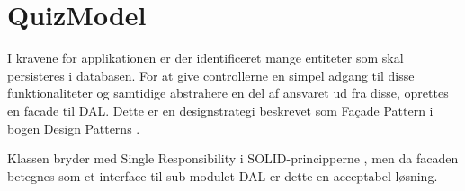 \section{QuizModel}

I kravene for applikationen er der identificeret mange entiteter som skal persisteres i databasen. For at give controllerne en  simpel adgang til disse funktionaliteter og samtidige abstrahere en del af ansvaret ud fra disse, oprettes en facade til DAL. Dette er en designstrategi beskrevet som Fa\c{c}ade Pattern i bogen Design Patterns \citep[s. 186-]{gof}.

Klassen bryder med Single Responsibility i SOLID-principperne \citep{wikiSolid}, men da facaden betegnes som et interface til sub-modulet DAL er dette en acceptabel løsning.